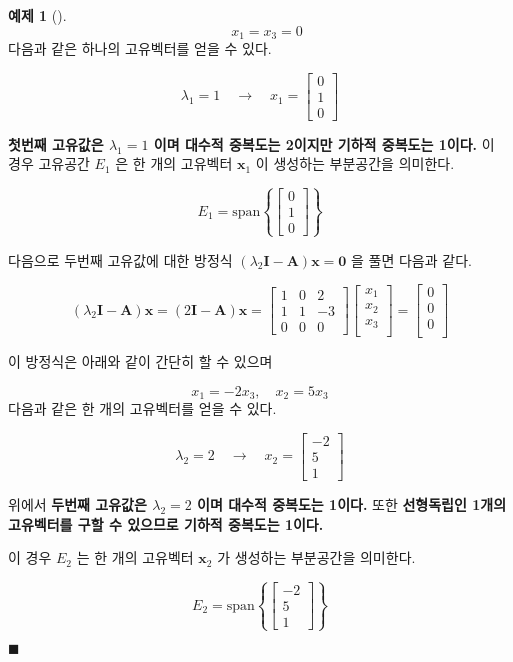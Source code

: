 \documentclass[
  11pt,
  a4paper,
  oneside]{scrbook}
\theoremstyle{definition}
\newtheorem{exercise}{예제}[chapter]
\theoremstyle{plain}
\theoremstyle{definition}
\theoremstyle{definition}
\theoremstyle{remark}
\begin{document}
\begin{exercise}[]
\[ \quad x_1 = x_3 =0 \] 다음과 같은 하나의 고유벡터를 얻을 수 있다.

\[ \lambda_1=1 \quad \rightarrow \quad  x_1=\begin{bmatrix} 0 \\ 1 \\ 0 \end{bmatrix} \]

\textbf{첫번째 고유값은 \(\lambda_1=1\) 이며 대수적 중복도는 2이지만
기하적 중복도는 1이다.} 이 경우 고유공간 \(E_1\) 은 한 개의 고유벡터
\(\pmb x_1\) 이 생성하는 부분공간을 의미한다.

\[
E_1 = \text{span}\left\{\begin{bmatrix}0 \\ 1 \\ 0\end{bmatrix} \right\}
\]

다음으로 두번째 고유값에 대한 방정식
\((\lambda_2 \pmb I -\pmb A )\pmb x = \pmb 0\) 을 풀면 다음과 같다.

\[
(\lambda_2 \pmb I -\pmb A )\pmb x= (2\pmb I -\pmb A )\pmb x = 
\begin{bmatrix}
1 & 0 & 2 \\
1 & 1 & -3 \\
0 & 0 & 0
\end{bmatrix}
\begin{bmatrix}
x_1 \\
x_2 \\
x_3 \\
\end{bmatrix}
=
\begin{bmatrix}
0 \\
0 \\
0 \\
\end{bmatrix}
\]

이 방정식은 아래와 같이 간단히 할 수 있으며

\[ x_1 = -2x_3, \quad x_2=5x_3  \] 다음과 같은 한 개의 고유벡터를 얻을
수 있다.

\[ 
\lambda_2=2\quad \rightarrow \quad  x_2=\begin{bmatrix}-2 \\ 5 \\ 1\end{bmatrix} 
\]

위에서 \textbf{두번째 고유값은 \(\lambda_2=2\) 이며 대수적 중복도는
1이다.} 또한 \textbf{선형독립인 1개의 고유벡터를 구할 수 있으므로 기하적
중복도는 1이다.}

이 경우 \(E_2\) 는 한 개의 고유벡터 \(\pmb x_2\) 가 생성하는 부분공간을
의미한다.

\[
E_2 = \text{span}\left\{\begin{bmatrix}-2\\ 5 \\ 1\end{bmatrix}\right\}
\]

\(\blacksquare\)

\end{exercise}
\end{document}
